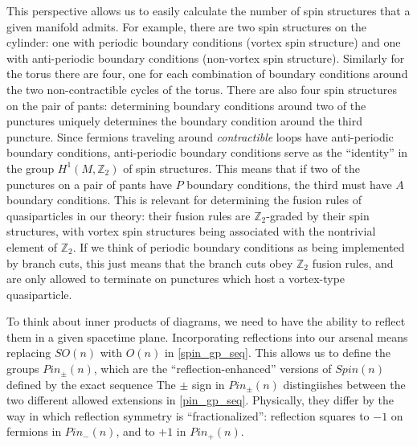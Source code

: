 \documentclass[12pt,a4paper]{article}
\newcommand{\zt}{\mathbb{Z}_2}
\begin{document}
This perspective allows us to easily calculate the number of spin structures that a given manifold admits. For example, there are two spin structures on the cylinder: one with periodic boundary conditions (vortex spin structure) and one with anti-periodic boundary conditions (non-vortex spin structure). Similarly for the torus there are four, one for each combination of boundary conditions around the two non-contractible cycles of the torus. There are also four spin structures on the pair of pants: determining boundary conditions around two of the punctures uniquely determines the boundary condition around the third puncture. Since fermions traveling around {\it contractible} loops have anti-periodic boundary conditions, anti-periodic boundary conditions serve as the ``identity'' in the group $H^1(M,\zt)$ of spin structures. This means that if two of the punctures on a pair of pants have $P$ boundary conditions, the third must have $A$ boundary conditions. This is relevant for determining the fusion rules of quasiparticles in our theory: their fusion rules are $\zt$-graded by their spin structures, with vortex spin structures being associated with the nontrivial element of $\zt$. If we think of periodic boundary conditions as being implemented by branch cuts, this just means that the branch cuts obey $\zt$ fusion rules, and are only allowed to terminate on punctures which host a vortex-type quasiparticle. 


To think about inner products of diagrams, we need to have the ability to reflect them in a given spacetime plane. Incorporating reflections into our arsenal means replacing $SO(n)$ with $O(n)$ in \eqref{spin_gp_seq}. This allows us to define the groups $Pin_\pm(n)$, which are the ``reflection-enhanced'' versions of $Spin(n)$ defined by the exact sequence 
 The $\pm$ sign in $Pin_\pm(n)$ distingiishes between the two different allowed extensions in \eqref{pin_gp_seq}. Physically, they differ by the way in which reflection symmetry is ``fractionalized'': reflection squares to $-1$ on fermions in $Pin_-(n)$, and to $+1$ in $Pin_+(n)$. 
\end{document}

